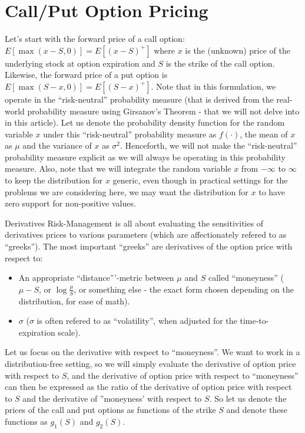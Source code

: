 \documentclass[11pt, oneside]{article}   	%
\begin{document}
\section{Call/Put Option Pricing}
Let's start with the forward price of a call option: $E[\max(x-S, 0)] = E[(x-S)^+]$ where $x$ is the (unknown) price of the underlying stock at option expiration and $S$ is the strike of the call option. Likewise, the forward price of a put option is $E[\max(S-x,0)] = E[(S-x)^+]$. Note that in this formulation, we operate in the ``risk-neutral'' probability measure (that is derived from the real-world probability measure using Girsanov's Theorem - that we will not delve into in this article). Let us denote the probability density function for the random variable $x$ under this ``risk-neutral'' probability measure as $f(\cdot)$, the mean of $x$ as $\mu$ and the variance of $x$ as $\sigma^2$. Henceforth, we will not make the ``risk-neutral'' probability measure explicit as we will always be operating in this probability measure. Also, note that we will integrate the random variable $x$ from $-\infty$ to $\infty$ to keep the distribution for $x$ generic, even though in practical settings for the problems we are considering here, we may want the distribution for $x$ to have zero support for non-positive values.

Derivatives Risk-Management is all about evaluating the sensitivities of derivatives prices to various parameters (which are affectionately refered to as ``greeks''). The most important ``greeks'' are derivatives of the option price with respect to:
\begin{itemize}
\item An appropriate ``distance'''-metric between $\mu$ and $S$ called ``moneyness'' ($\mu - S$, or $\log \frac \mu S$, or something else - the exact form chosen depending on the distribution, for ease of math).
\item $\sigma$ ($\sigma$ is often refered to as ``volatility'', when adjusted for the time-to-expiration scale).
\end{itemize}

Let us focus on the derivative with respect to ``moneyness''. We want to work in a distribution-free setting, so we will simply evaluate the derivative of option price with respect to $S$, and the derivative of option price with respect to ``moneyness'' can then be expressed as the ratio of the derivative of option price with respect to $S$ and the derivative of ''moneyness' with respect to $S$. So let us denote the prices of the call and put options as functions of the strike $S$ and denote these functions as $g_1(S)$ and $g_2(S)$.
\end{document}
